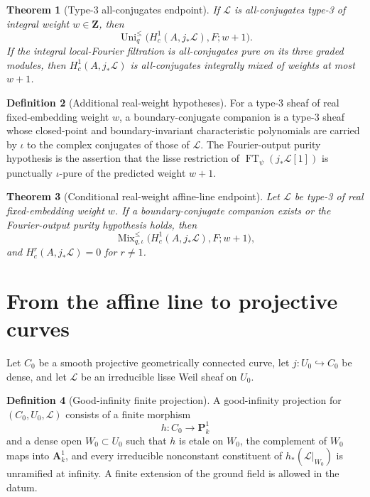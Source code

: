 \documentclass[10pt]{article}
\newtheorem{theorem}{Theorem}[section]
\theoremstyle{definition}
\newtheorem{definition}[theorem]{Definition}
\newcommand{\MixLe}{\operatorname{Mix}^{\leq}}
\newcommand{\UniLe}{\operatorname{Uni}^{\leq}}
\begin{document}
\begin{theorem}[Type-3 all-conjugates endpoint]
If \(\mathcal L\) is all-conjugates type-3 of integral weight
\(w\in\mathbf Z\), then
\[
 \UniLe_q\bigl(H_c^1(A,j_*\mathcal L),F;w+1\bigr).
\]
If the integral local-Fourier filtration is all-conjugates pure on its
three graded modules, then
\(H_c^1(A,j_*\mathcal L)\) is all-conjugates integrally mixed of weights at
most \(w+1\).
\end{theorem}

\begin{definition}[Additional real-weight hypotheses]
For a type-3 sheaf of real fixed-embedding weight \(w\), a
boundary-conjugate companion is a type-3 sheaf whose closed-point and
boundary-invariant characteristic polynomials are carried by \(\iota\) to
the complex conjugates of those of \(\mathcal L\).  The Fourier-output
purity hypothesis is the assertion that the lisse restriction of
\(\operatorname{FT}_\psi(j_*\mathcal L[1])\) is punctually
\(\iota\)-pure of the predicted weight \(w+1\).
\end{definition}

\begin{theorem}[Conditional real-weight affine-line endpoint]
Let \(\mathcal L\) be type-3 of real fixed-embedding weight \(w\).  If a
boundary-conjugate companion exists or the Fourier-output purity hypothesis
holds, then
\[
 \MixLe_{q,\iota}
 \bigl(H_c^1(A,j_*\mathcal L),F;w+1\bigr),
\]
and \(H_c^r(A,j_*\mathcal L)=0\) for \(r\ne1\).
\end{theorem}

\section{From the affine line to projective curves}

Let \(C_0\) be a smooth projective geometrically connected curve,
let \(j:U_0\hookrightarrow C_0\) be dense, and let \(\mathcal L\) be an
irreducible lisse Weil sheaf on \(U_0\).

\begin{definition}[Good-infinity finite projection]
A good-infinity projection for \((C_0,U_0,\mathcal L)\) consists of a finite
morphism
\[
                    h:C_0\longrightarrow\mathbf P^1_k
\]
and a dense open \(W_0\subset U_0\) such that \(h\) is etale on \(W_0\),
the complement of \(W_0\) maps into \(\mathbf A^1_k\), and every
irreducible nonconstant constituent of
\(h_*(\mathcal L|_{W_0})\) is unramified at infinity.  A finite extension of
the ground field is allowed in the datum.
\end{definition}
\end{document}
